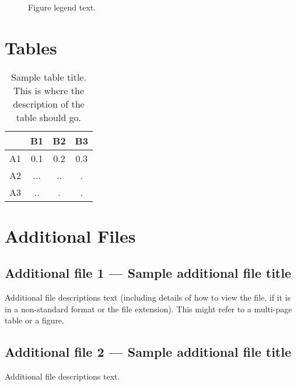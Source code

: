 \documentclass{bmcart}
\begin{document}
\begin{backmatter}
\begin{figure}[h!]
  \caption{
      Figure legend text.}
      \end{figure}


\section*{Tables}
\begin{table}[h!]
\caption{Sample table title. This is where the description of the table should go.}
      \begin{tabular}{cccc}
        \hline
           & B1  &B2   & B3\\ \hline
        A1 & 0.1 & 0.2 & 0.3\\
        A2 & ... & ..  & .\\
        A3 & ..  & .   & .\\ \hline
      \end{tabular}
\end{table}


\section*{Additional Files}
  \subsection*{Additional file 1 --- Sample additional file title}
    Additional file descriptions text (including details of how to
    view the file, if it is in a non-standard format or the file extension).  This might
    refer to a multi-page table or a figure.

  \subsection*{Additional file 2 --- Sample additional file title}
    Additional file descriptions text.


\end{backmatter}
\end{document}
